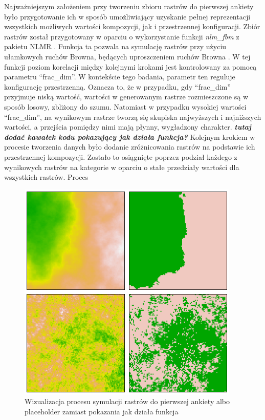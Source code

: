 \documentclass{amuthesis}
\begin{document}
Najważniejszym założeniem przy tworzeniu zbioru rastrów do pierwszej
ankiety było przygotowanie ich w sposób umożliwiający uzyskanie pełnej
reprezentacji wszystkich możliwych wartości kompozycji, jak i
przestrzennej konfiguracji. Zbiór rastrów został przygotowany w oparciu
o wykorzystanie funkcji \emph{nlm\_fbm} z pakietu NLMR
\autocite{NLMR2018}. Funkcja ta pozwala na symulację rastrów przy użyciu
ułamkowych ruchów Browna, będących uproszczeniem ruchów Browna
\autocite{nlm_fbm}. W tej funkcji poziom korelacji między kolejnymi
krokami jest kontrolowany za pomocą parametru ``frac\_dim''. W
kontekście tego badania, parametr ten reguluje konfigurację
przestrzenną. Oznacza to, że w przypadku, gdy ``frac\_dim'' przyjmuje
niską wartość, wartości w generowanym rastrze rozmieszczone są w sposób
losowy, zbliżony do szumu. Natomiast w przypadku wysokiej wartości
``frac\_dim'', na wynikowym rastrze tworzą się skupiska najwyższych i
najniższych wartości, a przejścia pomiędzy nimi mają płynny, wygładzony
charakter. \textbf{\emph{tutaj dodać kawałek kodu pokazujący jak działa
funkcja?}} Kolejnym krokiem w procesie tworzenia danych było dodanie
zróżnicowania rastrów na podstawie ich przestrzennej kompozycji. Zostało
to osiągnięte poprzez podział każdego z wynikowych rastrów na kategorie
w oparciu o stałe przedziały wartości dla wszystkich rastrów. Proces

\begin{figure}[t]

{\centering \includegraphics[width=4.16667in,height=4.16667in]{figures/wykres2_gen.png}

}

\caption{\label{fig-wykres2_gen}Wizualizacja procesu symulacji rastrów
do pierwszej ankiety albo placeholder zamiast pokazania jak działa
funkcja}

\end{figure}
\end{document}
